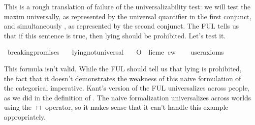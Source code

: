 \begin{isabellebody}
\begin{isamarkuptext}%
This is a rough translation of failure of the universalizability test: we will test the maxim universally,
as represented by the universal quantifier in the first conjunct, and simultaneously \cite{simul}, as represented by 
the second conjunct. The FUL tells us that if this sentence is true, then lying should be prohibited. 
Let's test it.%
\end{isamarkuptext}\isamarkuptrue%
\isamarkupfalse%
\ breaking{\isacharunderscore}promises{\isacharcolon}\isanewline
\ \ \ lying{\isacharunderscore}not{\isacharunderscore}universal\isanewline
\ \ \ {\isachardoublequoteopen}{\isacharparenleft}O\ {\isacharbraceleft}\isactrlbold {\isasymnot}\ {\isacharparenleft}lie{\isacharparenleft}me{\isacharparenright}{\isacharparenright}{\isacharbraceright}{\isacharparenright}\ cw{\isachardoublequoteclose}\isanewline
\ \ \isamarkupfalse%
\ {\isacharbrackleft}user{\isacharunderscore}axioms{\isacharbrackright}\isanewline
%
\isadelimproof
\ \ %
\endisadelimproof
%
\isatagproof
{}\isamarkupfalse%
\isanewline
%
\isanewline
%
\isanewline
%
%
\endisatagproof
{\isafoldproof}%
%
\isadelimproof
%
\endisadelimproof
%
\begin{isamarkuptext}%
This formula isn't valid. While the FUL should tell us that lying is prohibited, the fact that it 
doesn't demonstrates the weakness of this naive formulation of the categorical imperative. Kant's version of
the FUL universalizes across people, as we did in the definition of . The 
naive formalization universalizes across worlds using the $\Box$ operator, so it makes sense that it can't
handle this example appropriately.


\end{isamarkuptext}
\end{isabellebody}
